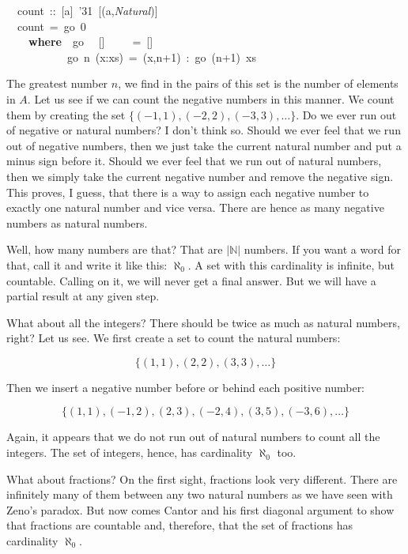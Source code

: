 \documentclass[tikz]{scrreprt}
\newcommand{\texfamily}{\fontfamily{cmtex}\selectfont}
\begin{document}
\begin{minipage}{\textwidth}
\begin{tabbing}\texfamily
~~count~::~[a]~\char'31~[(a,{\itshape Natural})]\\
\texfamily ~~count~=~go~0\\
\texfamily ~~~~{\bfseries where}~~go~ ~[]~~~~~=~[]\\
\texfamily ~~~~~~~~~~~go~n~(x:xs)~=~(x,n+1)~:~go~(n+1)~xs
\end{tabbing}
\end{minipage}

The greatest number $n$, we find in the pairs
of this set is the number of elements in $A$.
Let us see if we can count the negative numbers
in this manner.
We count them by creating the set 
$\lbrace (-1,1), (-2,2), (-3,3), \dots\rbrace$.
Do we ever run out of negative or natural numbers?
I don't think so. 
Should we ever feel that we run out of negative
numbers, then we just take the current natural number
and put a minus sign before it.
Should we ever feel that we run out of natural numbers,
then we simply take the current negative number
and remove the negative sign.
This proves, I guess, that there is a way
to assign each negative number to exactly one
natural number and vice versa.
There are hence as many negative numbers
as natural numbers.

Well, how many numbers are that?
That are $|\mathbb{N}|$ numbers.
If you want a word for that, call it 
 and write it like this: $\aleph_0$.
A set with this cardinality is infinite,
but countable. Calling \text{\texfamily count} on it,
we will never get a final answer.
But we will have a partial result at any given step.

What about all the integers?
There should be twice as much as natural numbers, right?
Let us see. We first create a set to count the 
natural numbers:

\[
\lbrace(1,1),(2,2),(3,3),\dots\rbrace
\]

Then we insert a negative number before or behind
each positive number:

\[
\lbrace(1,1),(-1,2),(2,3),(-2,4),(3,5),(-3,6),\dots\rbrace
\]

Again, it appears that we do not run out of natural numbers
to count all the integers. The set of integers,
hence, has cardinality $\aleph_0$ too.

What about fractions?
On the first sight, fractions look very different.
There are infinitely many of them between
any two natural numbers as we have seen 
with Zeno's paradox.
But now comes Cantor and his first
diagonal argument to show that fractions
are countable and, therefore, that the set of fractions
has cardinality $\aleph_0$.
\end{document}
